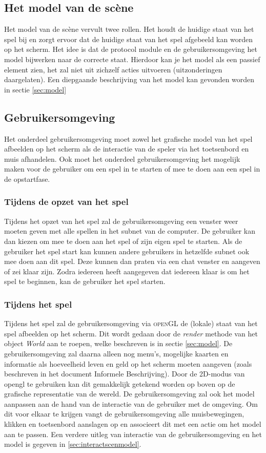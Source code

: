 \documentclass[a4paper,11pt]{article}
\begin{document}
    \subsection{Het model van de sc\`ene}
    Het model van de sc\`ene vervult twee rollen. Het houdt de huidige staat van het spel bij en zorgt ervoor dat de huidige staat van het spel afgebeeld kan worden op het scherm. Het idee is dat de protocol module en de gebruikersomgeving het model bijwerken naar de correcte staat. Hierdoor kan je het model als een passief element zien, het zal niet uit zichzelf acties uitvoeren (uitzonderingen daargelaten). Een diepgaande beschrijving van het model kan gevonden worden in sectie \ref{sec:model}
    
    \subsection{Gebruikersomgeving}
   	Het onderdeel gebruikersomgeving moet zowel het grafische model van het spel afbeelden op het scherm als de interactie van de speler via het toetsenbord en muis afhandelen. Ook moet het onderdeel gebruikersomgeving het mogelijk maken voor de gebruiker om een spel in te starten of mee te doen aan een spel in de opstartfase.
    
    \subsubsection{Tijdens de opzet van het spel}
    Tijdens het opzet van het spel zal de gebruikersomgeving een venster weer moeten geven met alle spellen in het subnet van de computer. De gebruiker kan dan kiezen om mee te doen aan het spel of zijn eigen spel te starten. Als de gebruiker het spel start kan kunnen andere gebruikers in hetzelfde subnet ook mee doen aan dit spel. Deze kunnen dan praten via een chat venster en aangeven of zei klaar zijn. Zodra iedereen heeft aangegeven dat iedereen klaar is om het spel te beginnen, kan de gebruiker het spel starten.
    
    \subsubsection{Tijdens het spel}
    Tijdens het spel zal de gebruikersomgeving via \textsc{openGL} de (lokale) staat van het spel afbeelden op het scherm. Dit wordt gedaan door de \emph{render} methode van het object \emph{World} aan te roepen, welke beschreven is in sectie \ref{sec:model}. De gebruikersomgeving zal daarna alleen nog menu's, mogelijke kaarten en informatie als hoeveelheid leven en geld op het scherm moeten aangeven (zoals beschreven in het document Informele Beschrijving). Door de 2D-modus van opengl te gebruiken kan dit gemakkelijk getekend worden op boven op de grafische representatie van de wereld.
	De gebruikersomgeving zal ook het model aanpassen aan de hand van de interactie van de gebruiker met de omgeving. Om dit voor elkaar te krijgen vangt de gebruikersomgeving alle muisbewegingen, klikken en toetsenbord aanslagen op en associeert dit met een actie om het model aan te passen. Een verdere uitleg van interactie van de gebruikersomgeving en het model is gegeven in \ref{sec:interactscenmodel}.
    
\end{document}
